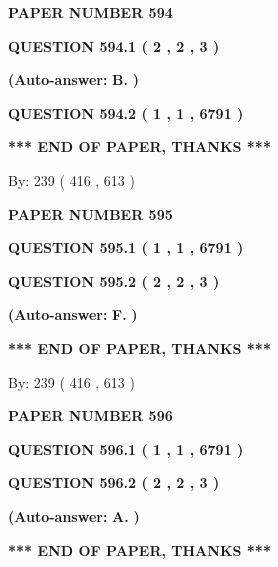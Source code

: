 \documentclass[12pt]{article}
\begin{document}
   
 {\textbf{ \Large{ PAPER NUMBER  594  }}}
   
   
   
   
  
  
{\textbf{\large{QUESTION
594.1 
 ( 2 , 2 , 3 )
}}}
 
 
{\textbf{(Auto-answer:}}
{\textbf{\large{
B.}}}
{\textbf{)}}
 
 
  
  
{\textbf{\large{QUESTION
594.2 
 ( 1 , 1 , 6791 )
}}}
   
   
   
   
\vspace{1.0in} 
{\textbf{\large{ *** END OF PAPER, THANKS *** }}} 
   
   
\hspace{1.0in} By: 
 239 ( 416 ,  613 )
   
   
   
   
\newpage 
\setcounter{page}{ 
   595001 } 
   
   
 {\textbf{ \Large{ PAPER NUMBER  595  }}}
   
   
   
   
  
  
{\textbf{\large{QUESTION
595.1 
 ( 1 , 1 , 6791 )
}}}
  
  
{\textbf{\large{QUESTION
595.2 
 ( 2 , 2 , 3 )
}}}
 
 
{\textbf{(Auto-answer:}}
{\textbf{\large{
F.}}}
{\textbf{)}}
 
 
   
   
   
   
\vspace{1.0in} 
{\textbf{\large{ *** END OF PAPER, THANKS *** }}} 
   
   
\hspace{1.0in} By: 
 239 ( 416 ,  613 )
   
   
   
   
\newpage 
\setcounter{page}{ 
   596001 } 
   
   
 {\textbf{ \Large{ PAPER NUMBER  596  }}}
   
   
   
   
  
  
{\textbf{\large{QUESTION
596.1 
 ( 1 , 1 , 6791 )
}}}
  
  
{\textbf{\large{QUESTION
596.2 
 ( 2 , 2 , 3 )
}}}
 
 
{\textbf{(Auto-answer:}}
{\textbf{\large{
A.}}}
{\textbf{)}}
 
 
   
   
   
   
\vspace{1.0in} 
{\textbf{\large{ *** END OF PAPER, THANKS *** }}} 
   
\end{document}
